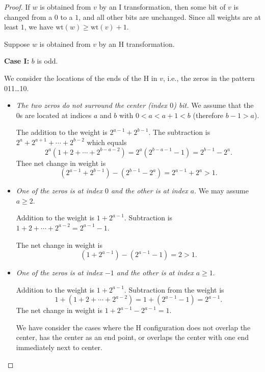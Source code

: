 \documentclass[12pt]{article}
\newcommand{\weight}[1]{\mathrm{wt}(#1)}
\begin{document}
\begin{proof}
  If $w$ is obtained from $v$ by an I transformation, then some bit of
  $v$ is changed from a $0$ to a $1$, and all other bits are
  unchanged. Since all weights are at least $1$, we have 
  $\weight w \ge \weight v + 1$.

  Suppose $w$ is obtained from $v$ by an H transformation. 

  \bigbreak

  \noindent\textbf{Case I:} $b$ is odd. 

  We consider the locations of the ends of the H in $v$, i.e., the
  zeros in the pattern 011\ldots10.

  \begin{itemize}
  \item \emph{The two zeros do not surround the center (index $0$) bit.}
    We assume that the 0s are located at indices $a$ and $b$ with
    $0<a<a+1<b$ (therefore $b-1>a$).


    The addition to the weight is $2^{a-1}+2^{b-1}$. The subtraction
    is $2^a+2^{a+1}+\cdots+2^{b-2}$ which equals
    \[
    2^a\left(1+2+\cdots+2^{b-a-2}\right) = 2^a(2^{b-a-1}-1) = 
    2^{b-1} - 2^a .
    \]
    Thee net change in weight is 
    \[
    \left(2^{a-1}+2^{b-1}\right) -\left(2^{b-1}-2^a\right) =
    2^{a-1}+2^a > 1.
    \]


    \item \emph{One of the zeros is at index $0$ and the other is at
        index $a$}. We may assume $a\ge2$. 

      Addition to the weight is $1 + 2^{a-1}$. Subtraction is
      $1+2+\cdots+2^{a-2}  = 2^{a-1}-1$. 
      
      The net change in weight is 
      \[
      \left(1+2^{a-1}\right) - \left( 2^{a-1}-1 \right) = 2 > 1.
      \]

    \item \emph{One of the zeros is at index $-1$ and the other is at
        index $a\ge1$}. 
      
      Addition to the weight is $1+2^{a-1}$.  Subtraction from the
      weight is 
      \[
      1 + \left(1+2+\cdots+2^{a-2}\right) = 1 + \left(2^{a-1}-1\right)
      = 2^{a-1}.
      \]
      The net change in weight is $1+2^{a-1}-2^{a-1}=1$. 

      \bigbreak
      We have consider the cases where the H configuration does not
      overlap the center, has the center as an end point, or overlaps
      the center with one end immediately next to center. 


\end{itemize}
\end{proof}
\end{document}
